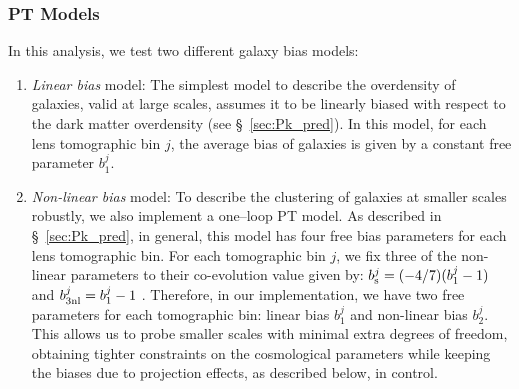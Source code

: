 \documentclass[aps, prd,twocolumn,superscriptaddress,nofootinbib,preprintnumbers]{revtex4-1}
\newcommand{\jdr}[1]{{\color{blue}[JDR: #1]}}
\begin{document}
\subsubsection{PT Models}
\label{sec:pt_models}
In this analysis, we test two different galaxy bias models:
\begin{enumerate}
    \item \textit{Linear bias} model: The simplest model to describe the overdensity of galaxies, valid at large scales, assumes it to be linearly biased with respect to the dark matter overdensity (see \S~\ref{sec:Pk_pred}). In this model, for each lens tomographic bin $j$, the average bias of galaxies is given by a constant free parameter $b^j_1$. 
    \item \textit{Non-linear bias} model: 
    To describe the clustering of galaxies at smaller scales robustly, we also implement a one--loop PT model. As described in \S~\ref{sec:Pk_pred}, in general, this model has four free bias parameters for each lens tomographic bin. For each tomographic bin $j$, we fix three of the non-linear parameters to their co-evolution value given by: $b^{j}_{\rm s} = (-4/7) (b^j_1 - 1)$ and $b^{j}_{\rm 3nl} = b^j_1 - 1$ \citep{McDonald2009,Saito2014a}. Therefore, in our implementation, we have two free parameters for each tomographic bin: linear bias $b^{j}_1$ and non-linear bias $b^{j}_2$. This allows us to probe smaller scales with minimal extra degrees of freedom, obtaining tighter constraints on the cosmological parameters while keeping the biases due to projection effects, as described below, in control. 
    

\end{enumerate}
\end{document}
